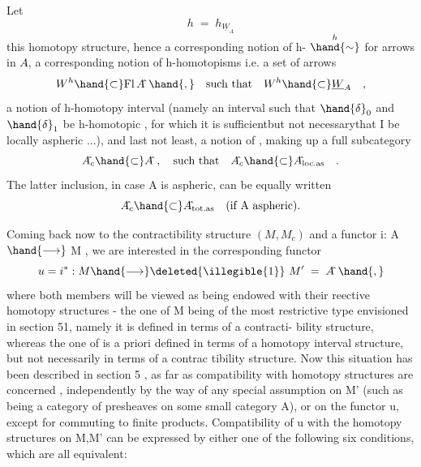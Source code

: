 
Let
\[ h \;=\; h_{\underline{W}_A} \]
this homotopy structure, hence a corresponding notion of h-\hand{\uline{\textcolor{black}{equivalence}}} 
$\overset{h}{\hand{\sim}}$ for arrows in $A\hat{}$, a corresponding notion of h-homotopisms i.e.
a set of arrows
\[ W^h \hand{\subset} \mathrm{Fl}\,A\hat{}\ \hand{,} \quad \text{such that} \quad W^h \hand{\subset} \underline{W}_A \quad , \]
a notion  of h-homotopy interval (namely an interval such that $\hand{\delta}_0$ and $\hand{\delta}_1$
be  h-homotopic , for which it is sufficient\hand{,}but not necessary\hand{,}that I
be locally aspheric ...), and last not least, a notion of \hand{\uline{\textcolor{black}{contractible}}}
\hand{\uline{\textcolor{black}{objects}}}, making up a full subcategory
\[ A\hat{}_c \hand{\subset} A\hat{}\ , \quad \text{such that} \quad A\hat{}_c \hand{\subset} A\hat{}_{\mathrm{loc.as}} \quad . \]
The latter inclusion, in case A is aspheric, can be equally written
\[ A\hat{}_c \hand{\subset} A\hat{}_{\mathrm{tot.as}} \quad \text{(if A aspheric).} \]

Coming back now to the contractibility structure $(M,M_c)$\hand{,} and a
functor  i: A $\hand{\longrightarrow}$ M , we are interested in the corresponding functor
\[ u = i^* : M \hand{\longrightarrow} \deleted{\illegible{1}}\ M' \;=\; A\hat{}\ \hand{,} \]
where both members will be viewed as being endowed with their reective
homotopy structures  -  the one of M being of the most restrictive type
envisioned in section 51, namely it is  defined in terms of a contracti-%
bility structure, whereas the one of  is a priori defined in terms of
a homotopy interval structure, but not necessarily in terms of a contrac
tibility structure. Now this situation has been described in section
5 , as far as compatibility  with homotopy structures are concerned ,
independently by the way of any special assumption on M'  (such as being
a category of presheaves on some small category A), or on the functor
u, except for commuting to finite products. Compatibility of u  with
the homotopy structures on M,M'  can be expressed by either one of the
following six conditions, which are all equivalent:

